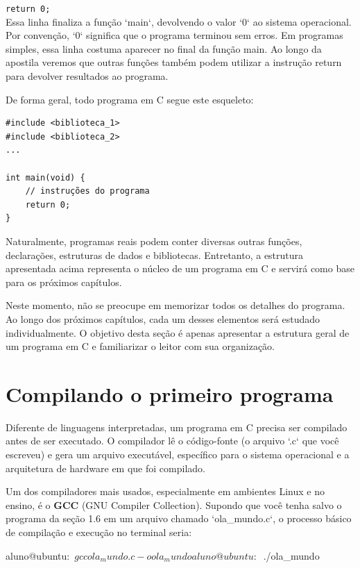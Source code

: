 \documentclass[12pt,a4paper,oneside]{extreport}
\begin{document}
\texttt{return 0;} \\
Essa linha finaliza a função `main`, devolvendo o valor `0` ao sistema operacional. Por convenção, `0` significa que o programa terminou sem erros. Em programas simples, essa linha costuma aparecer no final da função main. Ao longo da apostila veremos que outras funções também podem utilizar a instrução return para devolver resultados ao programa.

De forma geral, todo programa em C segue este esqueleto:

\begin{lstlisting}
#include <biblioteca_1>
#include <biblioteca_2>
...

int main(void) {
    // instruções do programa
    return 0;
}
\end{lstlisting}

Naturalmente, programas reais podem conter diversas outras funções, declarações, estruturas de dados e bibliotecas. Entretanto, a estrutura apresentada acima representa o núcleo de um programa em C e servirá como base para os próximos capítulos.

\begin{tcolorbox}[title=Observação]

Neste momento, não se preocupe em memorizar todos os detalhes do programa.
Ao longo dos próximos capítulos, cada um desses elementos será estudado
individualmente. O objetivo desta seção é apenas apresentar a estrutura geral
de um programa em C e familiarizar o leitor com sua organização.

\end{tcolorbox}


\section{Compilando o primeiro programa}

Diferente de linguagens interpretadas, um programa em C precisa ser compilado antes de ser executado. O compilador lê o código-fonte (o arquivo `.c` que você escreveu) e gera um arquivo executável, específico para o sistema operacional e a arquitetura de hardware em que foi compilado.

Um dos compiladores mais usados, especialmente em ambientes Linux e no ensino, é o \textbf{GCC} (GNU Compiler Collection). Supondo que você tenha salvo o programa da seção 1.6 em um arquivo chamado `ola\_mundo.c`, o processo básico de compilação e execução no terminal seria:


\begin{terminal}
aluno@ubuntu:~$ gcc ola_mundo.c -o ola_mundo

aluno@ubuntu:~$ ./ola_mundo

\end{terminal}
\end{document}
